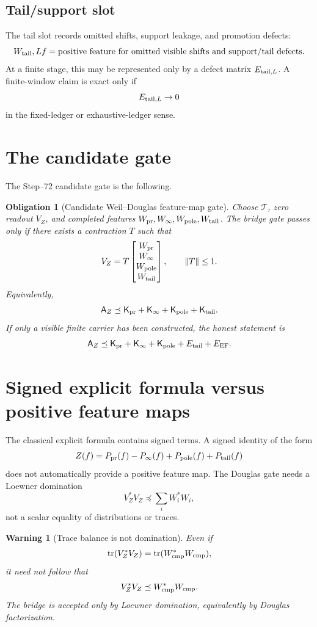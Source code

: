 \documentclass[11pt]{article}
\newtheorem{warning}{Warning}
\newtheorem{obligation}{Obligation}
\newcommand{\K}{\mathsf K}
\newcommand{\AZ}{\mathsf A_Z}
\newcommand{\T}{\mathcal T}
\newcommand{\Wcmp}{W_{\rm cmp}}
\newcommand{\Wpr}{W_{\rm pr}}
\newcommand{\Winf}{W_{\infty}}
\newcommand{\Wpole}{W_{\rm pole}}
\newcommand{\Wtail}{W_{\rm tail}}
\begin{document}
\subsection{Tail/support slot}
The tail slot records omitted shifts, support leakage, and promotion defects:
\[
  \Wtail,L f
  =\text{positive feature for omitted visible shifts and support/tail defects}.
\]
At a finite stage, this may be represented only by a defect matrix
\(E_{{\rm tail},L}\).  A finite-window claim is exact only if
\[
  E_{{\rm tail},L}\to0
\]
in the fixed-ledger or exhaustive-ledger sense.

\section{The candidate gate}
The Step--72 candidate gate is the following.

\begin{obligation}[Candidate Weil--Douglas feature-map gate]
Choose \(\T\), zero readout \(V_Z\), and completed features
\(\Wpr,\Winf,\Wpole,\Wtail\).  The bridge gate passes only if there exists a
contraction \(T\) such that
\[
  V_Z=T
  \begin{bmatrix}
    \Wpr\\ \Winf\\ \Wpole\\ \Wtail
  \end{bmatrix},
  \qquad \|T\|\le1.
\]
Equivalently,
\[
  \AZ\preceq
  \K_{\rm pr}+\K_\infty+\K_{\rm pole}+\K_{\rm tail}.
\]
If only a visible finite carrier has been constructed, the honest statement is
\[
  \AZ\preceq \K_{\rm pr}+\K_\infty+\K_{\rm pole}+E_{\rm tail}+E_{\rm EF}.
\]
\end{obligation}

\section{Signed explicit formula versus positive feature maps}
The classical explicit formula contains signed terms.  A signed identity of the
form
\[
  Z(f)=P_{\rm pr}(f)-P_\infty(f)+P_{\rm pole}(f)+P_{\rm tail}(f)
\]
does not automatically provide a positive feature map.  The Douglas gate needs
a Loewner domination
\[
  V_Z^*V_Z\preceq \sum_i W_i^*W_i,
\]
not a scalar equality of distributions or traces.

\begin{warning}[Trace balance is not domination]
Even if
\[
  \operatorname{tr}(V_Z^*V_Z)=\operatorname{tr}(\Wcmp^*\Wcmp),
\]
it need not follow that
\[
  V_Z^*V_Z\preceq\Wcmp^*\Wcmp.
\]
The bridge is accepted only by Loewner domination, equivalently by Douglas
factorization.
\end{warning}
\end{document}
